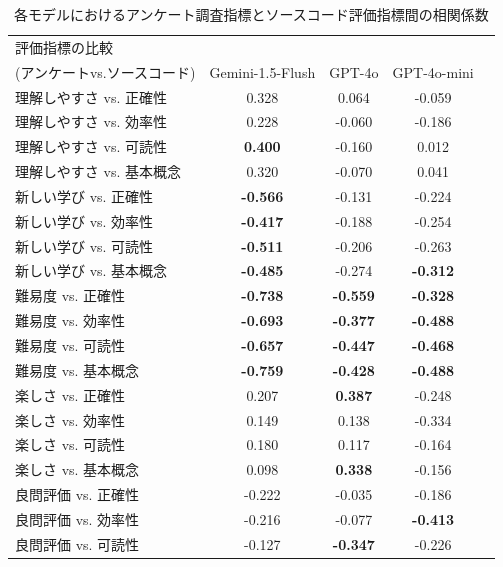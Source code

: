\documentclass[11pt]{jreport}
\begin{document}
\begin{table}[t]
  \centering
  \caption{各モデルにおけるアンケート調査指標とソースコード評価指標間の相関係数}
  \label{tab:correlation_results_all_detailed}
  \begin{threeparttable}
    \begin{tabular}{lcccc}
      \hline
      評価指標の比較\\(アンケートvs.ソースコード) & Gemini-1.5-Flush & GPT-4o & GPT-4o-mini \\
      \hline
      理解しやすさ vs. 正確性 & 0.328 & 0.064 & -0.059 \\
      理解しやすさ vs. 効率性 & 0.228 & -0.060 & -0.186 \\
      理解しやすさ vs. 可読性 & \textbf{0.400} & -0.160 & 0.012 \\
      理解しやすさ vs. 基本概念 & 0.320 & -0.070 & 0.041 \\
      \hline
      新しい学び vs. 正確性 & \textbf{-0.566} & -0.131 & -0.224 \\
      新しい学び vs. 効率性 & \textbf{-0.417} & -0.188 & -0.254 \\
      新しい学び vs. 可読性 & \textbf{-0.511} & -0.206 & -0.263 \\
      新しい学び vs. 基本概念 & \textbf{-0.485} & -0.274 & \textbf{-0.312} \\
      \hline
      難易度 vs. 正確性 & \textbf{-0.738} & \textbf{-0.559} & \textbf{-0.328} \\
      難易度 vs. 効率性 & \textbf{-0.693} & \textbf{-0.377} & \textbf{-0.488} \\
      難易度 vs. 可読性 & \textbf{-0.657} & \textbf{-0.447} & \textbf{-0.468} \\
      難易度 vs. 基本概念 & \textbf{-0.759} & \textbf{-0.428} & \textbf{-0.488} \\
      \hline
      楽しさ vs. 正確性 & 0.207 & \textbf{0.387} & -0.248 \\
      楽しさ vs. 効率性 & 0.149 & 0.138 & -0.334 \\
      楽しさ vs. 可読性 & 0.180 & 0.117 & -0.164 \\
      楽しさ vs. 基本概念 & 0.098 & \textbf{0.338} & -0.156 \\
      \hline
      良問評価 vs. 正確性 & -0.222 & -0.035 & -0.186 \\
      良問評価 vs. 効率性 & -0.216 & -0.077 & \textbf{-0.413} \\
      良問評価 vs. 可読性 & -0.127 & \textbf{-0.347} & -0.226 \\

\end{tabular}
\end{threeparttable}
\end{table}
\end{document}
